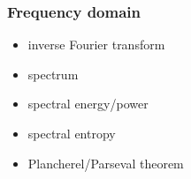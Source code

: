 \begin{frame}
	\frametitle{Frequency domain}
	\begin{itemize}
		\item inverse Fourier transform
		\item spectrum
		\item spectral energy/power
		\item spectral entropy
		\item Plancherel/Parseval theorem
	\end{itemize}
\end{frame}

